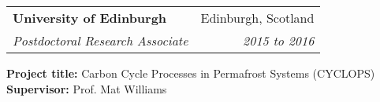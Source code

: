 \documentclass[11pt]{article}
\makeatletter
\newenvironment{newparagraph}{\par\setlength{\rightskip}{3cm}}
\newcommand{\resumeSection}[1]{
    \par
    \vspace{\baselineskip}
    \large {\sc {#1}}
    \par
    \vspace{-0.9\baselineskip}
    \hrulefill
    \vspace{0.5\baselineskip}
    \par
}
\newenvironment{resumeSubSectionHeader}{
    \par
    \begin{tabular*}{\textwidth}{l@{\extracolsep{\fill}}r}
    \par
} {
    \end{tabular*}
    \par
}
\newenvironment{resumeSubSectionBody}{
    \par
    \vspace{-0.8\parskip}
    \begin{small}
    \par
} {
    \par
    \end{small}
    \par
}
\makeatother
\begin{document}
%
%
\begin{resumeSubSectionHeader}

	\textbf{University of Edinburgh} & Edinburgh, Scotland \\
	 \emph{Postdoctoral Research Associate} & \emph{2015 to 2016} \\ 

\end{resumeSubSectionHeader}
\begin{resumeSubSectionBody}
	
	\textbf{Project title:} Carbon Cycle Processes in Permafrost Systems (CYCLOPS)\\
	\textbf{Supervisor:} Prof. Mat Williams


\end{resumeSubSectionBody}

\end{document}

